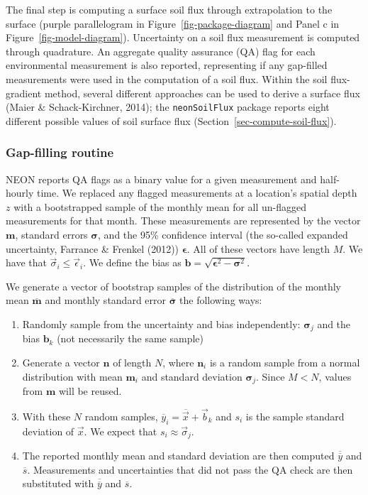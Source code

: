\documentclass[
  letterpaper,
  DIV=11,
  numbers=noendperiod]{scrartcl}
\providecommand{\tightlist}{%
  \setlength{\itemsep}{0pt}\setlength{\parskip}{0pt}}\usepackage{longtable,booktabs,array}
\begin{document}
The final step is computing a surface soil flux through extrapolation to
the surface (purple parallelogram in Figure~\ref{fig-package-diagram}
and Panel c in Figure~\ref{fig-model-diagram}). Uncertainty on a soil
flux measurement is computed through quadrature. An aggregate quality
assurance (QA) flag for each environmental measurement is also reported,
representing if any gap-filled measurements were used in the computation
of a soil flux. Within the soil flux-gradient method, several different
approaches can be used to derive a surface flux (Maier \&
Schack-Kirchner, 2014); the \texttt{neonSoilFlux} package reports eight
different possible values of soil surface flux
(Section~\ref{sec-compute-soil-flux}).

\subsubsection{Gap-filling routine}\label{sec-gapfilling}

NEON reports QA flags as a binary value for a given measurement and
half-hourly time. We replaced any flagged measurements at a location's
spatial depth \(z\) with a bootstrapped sample of the monthly mean for
all un-flagged measurements for that month. These measurements are
represented by the vector \(\mathbf{m}\), standard errors
\(\boldsymbol\sigma\), and the 95\% confidence interval (the so-called
expanded uncertainty, Farrance \& Frenkel (2012))
\(\boldsymbol\epsilon\). All of these vectors have length \(M\). We have
that \(\vec{\sigma}_{i}\leq\vec{\epsilon}_{i}\). We define the bias as
\(\mathbf{b}=\sqrt{\boldsymbol\epsilon^{2}-\boldsymbol\sigma^{2}}\).

We generate a vector of bootstrap samples of the distribution of the
monthly mean \(\overline{\boldsymbol{m}}\) and monthly standard error
\(\overline{\boldsymbol\sigma}\) the following ways:

\begin{enumerate}
\def\labelenumi{\arabic{enumi}.}
\tightlist
\item
  Randomly sample from the uncertainty and bias independently:
  \(\boldsymbol\sigma_{j}\) and the bias \(\mathbf{b}_{k}\) (not
  necessarily the same sample)
\item
  Generate a vector \(\mathbf{n}\) of length \(N\), where
  \(\mathbf{n}_{i}\) is a random sample from a normal distribution with
  mean \(\boldsymbol{m}_{i}\) and standard deviation
  \(\boldsymbol\sigma_{j}\). Since \(M<N\), values from \(\mathbf{m}\)
  will be reused.
\item
  With these \(N\) random samples,
  \(\overline{y}_{i}=\overline{\vec{x}}+\vec{b}_{k}\) and \(s_{i}\) is
  the sample standard deviation of \(\vec{x}\). We expect that
  \(s_{i} \approx \vec{\sigma}_{j}\).
\item
  The reported monthly mean and standard deviation are then computed
  \(\overline{\overline{y}}\) and \(\overline{s}\). Measurements and
  uncertainties that did not pass the QA check are then substituted with
  \(\overline{\overline{y}}\) and \(\overline{s}\).
\end{enumerate}
\end{document}
